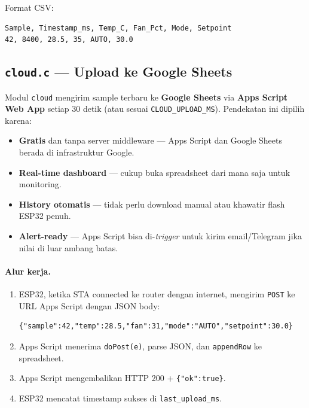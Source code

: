 \documentclass[11pt,a4paper]{article}
\begin{document}
Format CSV:
\begin{verbatim}
Sample, Timestamp_ms, Temp_C, Fan_Pct, Mode, Setpoint
42, 8400, 28.5, 35, AUTO, 30.0
\end{verbatim}

\subsection{\texttt{cloud.c} --- Upload ke Google Sheets}

Modul \texttt{cloud} mengirim sample terbaru ke \textbf{Google Sheets} via \textbf{Apps Script Web App} setiap 30 detik (atau sesuai \texttt{CLOUD\_UPLOAD\_MS}). Pendekatan ini dipilih karena:
\begin{itemize}
    \item \textbf{Gratis} dan tanpa server middleware --- Apps Script dan Google Sheets berada di infrastruktur Google.
    \item \textbf{Real-time dashboard} --- cukup buka spreadsheet dari mana saja untuk monitoring.
    \item \textbf{History otomatis} --- tidak perlu download manual atau khawatir flash ESP32 penuh.
    \item \textbf{Alert-ready} --- Apps Script bisa di-\emph{trigger} untuk kirim email/Telegram jika nilai di luar ambang batas.
\end{itemize}

\paragraph{Alur kerja.}
\begin{enumerate}
    \item ESP32, ketika STA connected ke router dengan internet, mengirim \texttt{POST} ke URL Apps Script dengan JSON body:
    \begin{lstlisting}[caption={Contoh JSON body yang dikirim ESP32}]
{"sample":42,"temp":28.5,"fan":31,"mode":"AUTO","setpoint":30.0}
    \end{lstlisting}
    \item Apps Script menerima \texttt{doPost(e)}, parse JSON, dan \texttt{appendRow} ke spreadsheet.
    \item Apps Script mengembalikan HTTP 200 + \texttt{\{"ok":true\}}.
    \item ESP32 mencatat timestamp sukses di \texttt{last\_upload\_ms}.
\end{enumerate}
\end{document}
